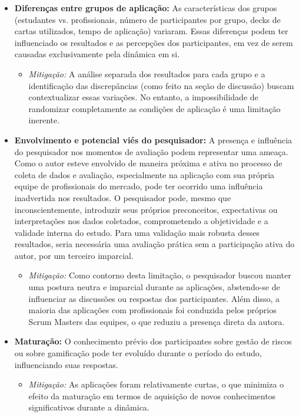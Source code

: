 \documentclass[
	12pt,
	openright,
	twoside,
	a4paper,
	english,
	brazil
	]{abntex2}
\begin{document}
\begin{itemize}
  \item \textbf{Diferenças entre grupos de aplicação:} As características dos grupos (estudantes vs. profissionais, número de participantes por grupo, decks de cartas utilizados, tempo de aplicação) variaram. Essas diferenças podem ter influenciado os resultados e as percepções dos participantes, em vez de serem causadas exclusivamente pela dinâmica em si.
  \begin{itemize}
    \item \textit{Mitigação:} A análise separada dos resultados para cada grupo e a identificação das discrepâncias (como feito na seção de discussão) buscam contextualizar essas variações. No entanto, a impossibilidade de randomizar completamente as condições de aplicação é uma limitação inerente.
    \end{itemize}
  \item \textbf{Envolvimento e potencial viés do pesquisador:} A presença e influência do pesquisador nos momentos de avaliação podem representar uma ameaça. Como o autor esteve envolvido de maneira próxima e ativa no processo de coleta de dados e avaliação, especialmente na aplicação com sua própria equipe de profissionais do mercado, pode ter ocorrido uma influência inadvertida nos resultados. O pesquisador pode, mesmo que inconscientemente, introduzir seus próprios preconceitos, expectativas ou interpretações nos dados coletados, comprometendo a objetividade e a validade interna do estudo. Para uma validação mais robusta desses resultados, seria necessária uma avaliação prática sem a participação ativa do autor, por um terceiro imparcial.
  \begin{itemize}
    \item \textit{Mitigação:} Como contorno desta limitação, o pesquisador buscou manter uma postura neutra e imparcial durante as aplicações, abstendo-se de influenciar as discussões ou respostas dos participantes. Além disso, a maioria das aplicações com profissionais foi conduzida pelos próprios Scrum Masters das equipes, o que reduziu a presença direta da autora.
    \end{itemize}
  \item \textbf{Maturação:} O conhecimento prévio dos participantes sobre gestão de riscos ou sobre gamificação pode ter evoluído durante o período do estudo, influenciando suas respostas.
    \begin{itemize}
    \item \textit{Mitigação:} As aplicações foram relativamente curtas, o que minimiza o efeito da maturação em termos de aquisição de novos conhecimentos significativos durante a dinâmica.

\end{itemize}
\end{itemize}
\end{document}

